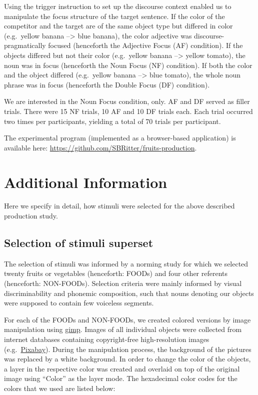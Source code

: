 \documentclass[
]{article}
\begin{document}
Using the trigger instruction to set up the discourse context enabled us
to manipulate the focus structure of the target sentence. If the color
of the competitor and the target are of the same object type but
differed in color (e.g.~yellow banana --\textgreater{} blue banana), the
color adjective was discourse-pragmatically focused (henceforth the
Adjective Focus (AF) condition). If the objects differed but not their
color (e.g.~yellow banana --\textgreater{} yellow tomato), the noun was
in focus (henceforth the Noun Focus (NF) condition). If both the color
and the object differed (e.g.~yellow banana --\textgreater{} blue
tomato), the whole noun phrase was in focus (henceforth the Double Focus
(DF) condition).

We are interested in the Noun Focus condition, only. AF and DF served as
filler trials. There were 15 NF trials, 10 AF and 10 DF trials each.
Each trial occurred two times per participants, yielding a total of 70
trials per participant.

The experimental program (implemented as a browser-based application) is
available here: \url{https://github.com/SBRitter/fruits-production}.

\appendix

\hypertarget{adds}{%
\section{Additional Information}\label{adds}}

Here we specify in detail, how stimuli were selected for the above
described production study.

\hypertarget{selection-of-stimuli-superset}{%
\subsection{Selection of stimuli
superset}\label{selection-of-stimuli-superset}}

The selection of stimuli was informed by a norming study for which we
selected twenty fruits or vegetables (henceforth: FOODs) and four other
referents (henceforth: NON-FOODs). Selection criteria were mainly
informed by visual discriminability and phonemic composition, such that
nouns denoting our objects were supposed to contain few voiceless
segments.

For each of the FOODs and NON-FOODs, we created colored versions by
image manipulation using \href{http://www.gimp.org}{gimp}. Images of all
individual objects were collected from internet databases containing
copyright-free high-resolution images
(e.g.~\href{https://pixabay.com}{Pixabay}). During the manipulation
process, the background of the pictures was replaced by a white
background. In order to change the color of the objects, a layer in the
respective color was created and overlaid on top of the original image
using ``Color'' as the layer mode. The hexadecimal color codes for the
colors that we used are listed below:
\end{document}

